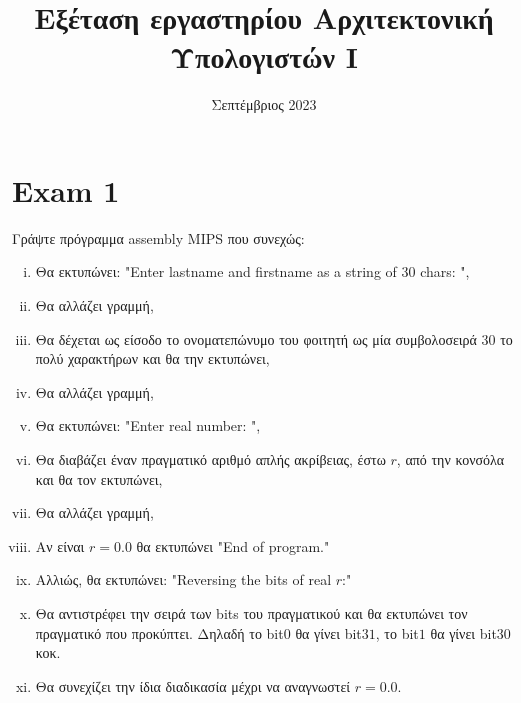 \documentclass{article}
\title{Εξέταση εργαστηρίου Αρχιτεκτονική Υπολογιστών Ι}
\author{}
\date{Σεπτέμβριος 2023}
\begin{document}
\maketitle
\setcounter{equation}{0}
\section*{Exam 1}
Γράψτε πρόγραμμα assembly MIPS που συνεχώς:
\begin{enumerate}[i.]
    \itemsep0em
    \item Θα εκτυπώνει: "Enter lastname and firstname as a string of $30$ chars: ",
    \item Θα αλλάζει γραμμή,
    \item Θα δέχεται ως είσοδο το ονοματεπώνυμο του φοιτητή ως μία συμβολοσειρά $30$ το πολύ χαρακτήρων και θα την εκτυπώνει,
    \item Θα αλλάζει γραμμή,
    \item Θα εκτυπώνει: "Enter real number: ",
    \item Θα διαβάζει έναν πραγματικό αριθμό απλής ακρίβειας, έστω $r$, από την κονσόλα και θα τον εκτυπώνει,
    \item Θα αλλάζει γραμμή,
    \item Αν είναι $r=0.0$ θα εκτυπώνει "End of program."
    \item Αλλιώς, θα εκτυπώνει: "Reversing the bits of real $r$:"
    \item Θα αντιστρέφει την σειρά των bits του πραγματικού και θα εκτυπώνει τον πραγματικό που προκύπτει. Δηλαδή το bit$0$ θα γίνει bit$31$, το bit$1$ θα γίνει bit$30$ κοκ.
    \item Θα συνεχίζει την ίδια διαδικασία μέχρι να αναγνωστεί $r=0.0$.
\end{enumerate}
\newpage
\end{document}
